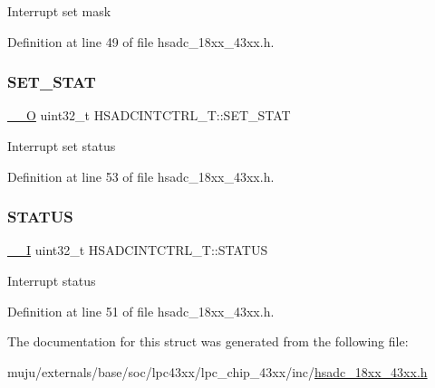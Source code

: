 Interrupt set mask 

Definition at line 49 of file hsadc\+\_\+18xx\+\_\+43xx.\+h.

\mbox{\label{struct_h_s_a_d_c_i_n_t_c_t_r_l___t_a843f7fb20666584fc5af715bf83856a6}} 
\subsubsection{\texorpdfstring{S\+E\+T\+\_\+\+S\+T\+AT}{SET\_STAT}}
{\footnotesize\ttfamily \hyperlink{core__sc300_8h_a7e25d9380f9ef903923964322e71f2f6}{\+\_\+\+\_\+O} uint32\+\_\+t H\+S\+A\+D\+C\+I\+N\+T\+C\+T\+R\+L\+\_\+\+T\+::\+S\+E\+T\+\_\+\+S\+T\+AT}

Interrupt set status 

Definition at line 53 of file hsadc\+\_\+18xx\+\_\+43xx.\+h.

\mbox{\label{struct_h_s_a_d_c_i_n_t_c_t_r_l___t_a25e9a6bc46c055d245ed25759ea36393}} 
\subsubsection{\texorpdfstring{S\+T\+A\+T\+US}{STATUS}}
{\footnotesize\ttfamily \hyperlink{core__sc300_8h_af63697ed9952cc71e1225efe205f6cd3}{\+\_\+\+\_\+I} uint32\+\_\+t H\+S\+A\+D\+C\+I\+N\+T\+C\+T\+R\+L\+\_\+\+T\+::\+S\+T\+A\+T\+US}

Interrupt status 

Definition at line 51 of file hsadc\+\_\+18xx\+\_\+43xx.\+h.



The documentation for this struct was generated from the following file\+:\begin{DoxyCompactItemize}
\item 
muju/externals/base/soc/lpc43xx/lpc\+\_\+chip\+\_\+43xx/inc/\hyperlink{hsadc__18xx__43xx_8h}{hsadc\+\_\+18xx\+\_\+43xx.\+h}\end{DoxyCompactItemize}
